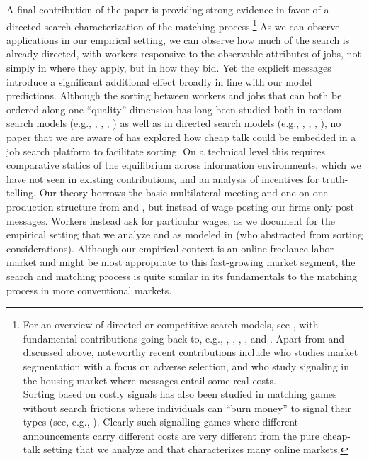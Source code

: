 \documentclass[12pt]{article}
\begin{document}
A final contribution of the paper is providing strong evidence in favor of a directed search characterization of the matching process.\footnote{For an overview of directed or competitive search models, see \cite{wright_etal2021}, with fundamental contributions going back to, e.g., \cite{peters_1991}, \cite{peters_1997}, \cite{moen1997competitive}, \cite{acemoglu_shimer_1999}, and \cite{burdett_etal2001}. Apart from \cite{menzio2007theory} and \cite{kimKircher2015} discussed above, noteworthy recent contributions include \cite{kim_2012} who studies market segmentation with a focus on adverse selection, and \cite{albrecht_etal2016} who study signaling in the housing market where messages entail some real costs.\\ Sorting based on costly signals has also been studied in matching games without search frictions where individuals can ``burn money'' to signal their types (see, e.g., \cite{hoppe2009theory}). Clearly such signalling games where different announcements carry different costs are very different from the pure cheap-talk setting that we analyze and that characterizes many online markets.}
As we can observe applications in our empirical setting, we can observe how much of the search is already directed, with workers responsive to the observable attributes of jobs, not simply in where they apply, but in how they bid.
Yet the explicit messages introduce a significant additional effect broadly in line with our model predictions.
Although the sorting between workers and jobs that can both be ordered along one ``quality'' dimension has long been studied both in random search models (e.g., \cite{shimer2000assortative}, \cite{teulings2004right, gautier2006large}, \cite{eeckhout2010sorting}, \citep{bagger2019empirical}) as well as in directed search models (e.g., \cite{shi2001, shi2002}, \cite{shimer_2005}, \cite{eeckhout2011identifying}, \cite{cai2021search}), no paper that we are aware of has explored how cheap talk could be embedded in a job search platform to facilitate sorting. On a technical level this requires comparative statics of the equilibrium across information environments, which we have not seen in existing contributions, and an analysis of incentives for truth-telling. Our theory borrows the basic multilateral meeting and one-on-one production structure from \cite{shi2002} and \cite{shimer_2005}, but instead of wage posting our firms only post messages. Workers instead ask for particular wages, as we document for the empirical setting that we analyze and as modeled in \cite{kimKircher2015} (who abstracted from sorting considerations). Although our empirical context is an online freelance labor market and might be most appropriate to this fast-growing market segment, the search and matching process is quite similar in its fundamentals to the matching process in more conventional markets.  
\end{document}
